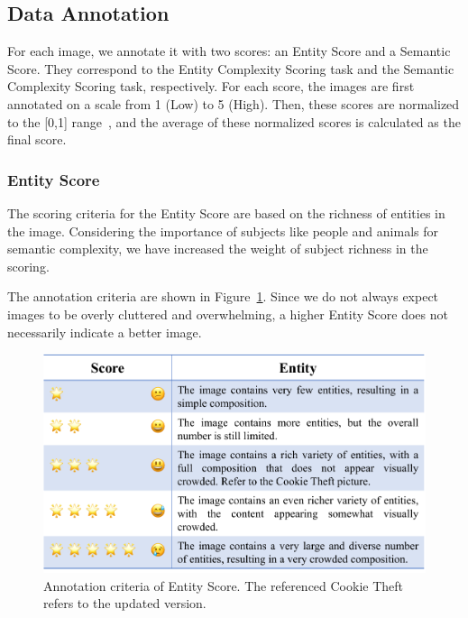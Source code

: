 
\subsection{Data Annotation}

For each image, we annotate it with two scores: an Entity Score and a Semantic Score. 
They correspond to the Entity Complexity Scoring task and the Semantic Complexity Scoring task, respectively.
For each score, the images are first annotated on a scale from 1 (Low) to 5 (High).
Then, these scores are normalized to the [0,1] range~\cite{ic9600}, and the average of these normalized scores is calculated as the final score.

\subsubsection{Entity Score}
The scoring criteria for the Entity Score are based on the richness of entities in the image.
Considering the importance of subjects like people and animals for semantic complexity, we have increased the weight of subject richness in the scoring.

The annotation criteria are shown in Figure~\ref{entity_ann}. 
Since we do not always expect images to be overly cluttered and overwhelming, a higher Entity Score does not necessarily indicate a better image.

\begin{figure}[ht]
    \centering
    \includegraphics[scale=0.48]{figs/entity_ann2.pdf}
    \caption{Annotation criteria of Entity Score. The referenced Cookie Theft refers to the updated version.
    }
    \label{entity_ann}
\end{figure}

